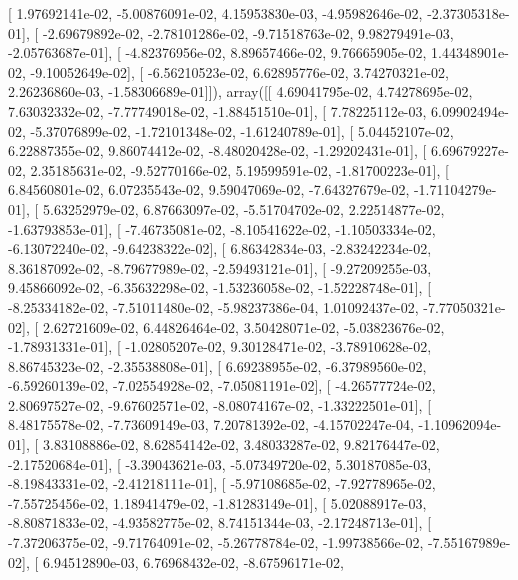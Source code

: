 \documentclass{article}
\begin{document}
       [  1.97692141e-02,  -5.00876091e-02,   4.15953830e-03,
         -4.95982646e-02,  -2.37305318e-01],
       [ -2.69679892e-02,  -2.78101286e-02,  -9.71518763e-02,
          9.98279491e-03,  -2.05763687e-01],
       [ -4.82376956e-02,   8.89657466e-02,   9.76665905e-02,
          1.44348901e-02,  -9.10052649e-02],
       [ -6.56210523e-02,   6.62895776e-02,   3.74270321e-02,
          2.26236860e-03,  -1.58306689e-01]]), array([[  4.69041795e-02,   4.74278695e-02,   7.63032332e-02,
         -7.77749018e-02,  -1.88451510e-01],
       [  7.78225112e-03,   6.09902494e-02,  -5.37076899e-02,
         -1.72101348e-02,  -1.61240789e-01],
       [  5.04452107e-02,   6.22887355e-02,   9.86074412e-02,
         -8.48020428e-02,  -1.29202431e-01],
       [  6.69679227e-02,   2.35185631e-02,  -9.52770166e-02,
          5.19599591e-02,  -1.81700223e-01],
       [  6.84560801e-02,   6.07235543e-02,   9.59047069e-02,
         -7.64327679e-02,  -1.71104279e-01],
       [  5.63252979e-02,   6.87663097e-02,  -5.51704702e-02,
          2.22514877e-02,  -1.63793853e-01],
       [ -7.46735081e-02,  -8.10541622e-02,  -1.10503334e-02,
         -6.13072240e-02,  -9.64238322e-02],
       [  6.86342834e-03,  -2.83242234e-02,   8.36187092e-02,
         -8.79677989e-02,  -2.59493121e-01],
       [ -9.27209255e-03,   9.45866092e-02,  -6.35632298e-02,
         -1.53236058e-02,  -1.52228748e-01],
       [ -8.25334182e-02,  -7.51011480e-02,  -5.98237386e-04,
          1.01092437e-02,  -7.77050321e-02],
       [  2.62721609e-02,   6.44826464e-02,   3.50428071e-02,
         -5.03823676e-02,  -1.78931331e-01],
       [ -1.02805207e-02,   9.30128471e-02,  -3.78910628e-02,
          8.86745323e-02,  -2.35538808e-01],
       [  6.69238955e-02,  -6.37989560e-02,  -6.59260139e-02,
         -7.02554928e-02,  -7.05081191e-02],
       [ -4.26577724e-02,   2.80697527e-02,  -9.67602571e-02,
         -8.08074167e-02,  -1.33222501e-01],
       [  8.48175578e-02,  -7.73609149e-03,   7.20781392e-02,
         -4.15702247e-04,  -1.10962094e-01],
       [  3.83108886e-02,   8.62854142e-02,   3.48033287e-02,
          9.82176447e-02,  -2.17520684e-01],
       [ -3.39043621e-03,  -5.07349720e-02,   5.30187085e-03,
         -8.19843331e-02,  -2.41218111e-01],
       [ -5.97108685e-02,  -7.92778965e-02,  -7.55725456e-02,
          1.18941479e-02,  -1.81283149e-01],
       [  5.02088917e-03,  -8.80871833e-02,  -4.93582775e-02,
          8.74151344e-03,  -2.17248713e-01],
       [ -7.37206375e-02,  -9.71764091e-02,  -5.26778784e-02,
         -1.99738566e-02,  -7.55167989e-02],
       [  6.94512890e-03,   6.76968432e-02,  -8.67596171e-02,
\end{document}
